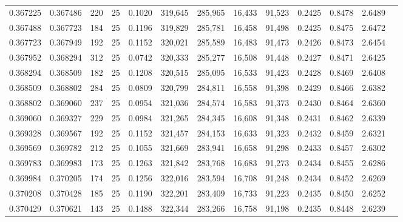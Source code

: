 \begin{tabular}{rrrrrrrrrrrrr}
0.367225 & 0.367486 &   220 &  25 &                                     0.1020 & 319,645 & 285,965 &  16,433 &  91,523 & 0.2425 & 0.8478 & 2.6489 \\
0.367488 & 0.367723 &   184 &  25 &                                     0.1196 & 319,829 & 285,781 &  16,458 &  91,498 & 0.2425 & 0.8475 & 2.6472 \\
0.367723 & 0.367949 &   192 &  25 &                                     0.1152 & 320,021 & 285,589 &  16,483 &  91,473 & 0.2426 & 0.8473 & 2.6454 \\
0.367952 & 0.368294 &   312 &  25 &                                     0.0742 & 320,333 & 285,277 &  16,508 &  91,448 & 0.2427 & 0.8471 & 2.6425 \\
0.368294 & 0.368509 &   182 &  25 &                                     0.1208 & 320,515 & 285,095 &  16,533 &  91,423 & 0.2428 & 0.8469 & 2.6408 \\
0.368509 & 0.368802 &   284 &  25 &                                     0.0809 & 320,799 & 284,811 &  16,558 &  91,398 & 0.2429 & 0.8466 & 2.6382 \\
0.368802 & 0.369060 &   237 &  25 &                                     0.0954 & 321,036 & 284,574 &  16,583 &  91,373 & 0.2430 & 0.8464 & 2.6360 \\
0.369060 & 0.369327 &   229 &  25 &                                     0.0984 & 321,265 & 284,345 &  16,608 &  91,348 & 0.2431 & 0.8462 & 2.6339 \\
0.369328 & 0.369567 &   192 &  25 &                                     0.1152 & 321,457 & 284,153 &  16,633 &  91,323 & 0.2432 & 0.8459 & 2.6321 \\
0.369569 & 0.369782 &   212 &  25 &                                     0.1055 & 321,669 & 283,941 &  16,658 &  91,298 & 0.2433 & 0.8457 & 2.6302 \\
0.369783 & 0.369983 &   173 &  25 &                                     0.1263 & 321,842 & 283,768 &  16,683 &  91,273 & 0.2434 & 0.8455 & 2.6286 \\
0.369984 & 0.370205 &   174 &  25 &                                     0.1256 & 322,016 & 283,594 &  16,708 &  91,248 & 0.2434 & 0.8452 & 2.6269 \\
0.370208 & 0.370428 &   185 &  25 &                                     0.1190 & 322,201 & 283,409 &  16,733 &  91,223 & 0.2435 & 0.8450 & 2.6252 \\
0.370429 & 0.370621 &   143 &  25 &                                     0.1488 & 322,344 & 283,266 &  16,758 &  91,198 & 0.2435 & 0.8448 & 2.6239 \\

\end{tabular}
